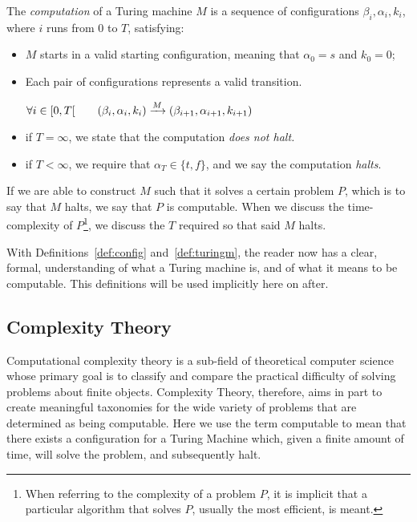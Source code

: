 \documentclass[11pt,letterpaper]{article}
\theoremstyle{definition}
\begin{document}
The \emph{computation} of a Turing machine \(M \) is a sequence of configurations \(\beta_i, \alpha_i, k_i \), where \(i \) runs from \(0 \) to \(T \), satisfying:
\begin{itemize}
    \item \(M \) starts in a valid starting configuration, meaning that \(\alpha_0 = s \) and \(k_0 = 0 \);
    \item Each pair of configurations represents a valid transition.

        \(\forall i\in\interval[open right]{0}{T}\qquad(\beta_i, \alpha_i, k_i)\xrightarrow{M}(\beta_{i+1}, \alpha_{i+1}, k_{i+1}) \)

    \item if \(T = \infty \), we state that the computation \emph{does not halt.}
    \item if \(T < \infty \), we require that \(\alpha_T \in \{t, f\} \), and we say the computation \emph{halts}.
\end{itemize}

If we are able to construct \(M\) such that it solves a certain problem \(P\), which is to say that \(M\) halts, we say that \(P\) is computable. When we discuss the time-complexity of \(P\)\footnote{When referring to the complexity of a problem \(P\), it is implicit that a particular algorithm that solves \(P\), usually the most efficient, is meant.}, we discuss the \(T\) required so that said \(M\) halts.

With Definitions~\ref{def:config} and~\ref{def:turingm}, the reader now has a clear, formal, understanding of what a Turing machine is, and of what it means to be computable. This definitions will be used implicitly here on after.

\subsection{Complexity Theory}
Computational complexity theory is a sub-field of theoretical computer science whose primary goal is to classify and compare the practical difficulty of solving problems about finite objects.\autocite{sep-computational-complexity} Complexity Theory, therefore, aims in part to create meaningful taxonomies for the wide variety of problems that are determined as being computable. Here we use the term computable to mean that there exists a configuration for a Turing Machine which, given a finite amount of time, will solve the problem, and subsequently halt.
\end{document}
